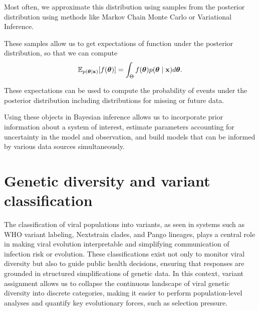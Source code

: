Most often, we approximate this distribution using samples from the posterior distribution using methods like Markov Chain Monte Carlo or Variational Inference.

These samples allow us to get expectations of function under the posterior distribution, so that we can compute
\begin{align}
\mathbb{E}_{p(\boldsymbol{\mathbf{\theta}} \mid \boldsymbol{\mathbf{x}})}[f(\boldsymbol{\mathbf{\theta}})] = \int_{\Theta} f(\boldsymbol{\mathbf{\theta}}) p(\boldsymbol{\mathbf{\theta}} \mid \boldsymbol{\mathbf{x}}) d \boldsymbol{\mathbf{\theta}}.
\end{align}

These expectations can be used to compute the probability of events under the posterior distribution including distributions for missing or future data.



Using these objects in Bayesian inference allows us to incorporate prior information about a system of interest, estimate parameters accounting for uncertainty in the model and observation, and build models that can be informed by various data sources simultaneously.

\section{Genetic diversity and variant classification}

The classification of viral populations into variants, as seen in systems such as WHO variant labeling, Nextstrain clades, and Pango lineages, plays a central role in making viral evolution interpretable and simplifying communication of infection risk or evolution. \cite{Hadfield2018, aksamentov2021nextclade, Rambaut2020}
These classifications exist not only to monitor viral diversity but also to guide public health decisions, ensuring that responses are grounded in structured simplifications of genetic data.
In this context, variant assignment allows us to collapse the continuous landscape of viral genetic diversity into discrete categories, making it easier to perform population-level analyses and quantify key evolutionary forces, such as selection pressure.

